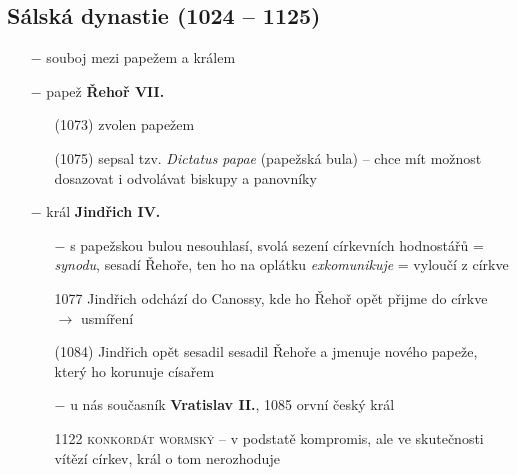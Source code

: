 \documentclass{article}
\begin{document}
\subsection*{Sálská dynastie (1024 -- 1125)}
\begin{itemize}
    \vspace{-0.5em}
    \setlength\itemsep{0.15em}
    \item[$-$] souboj mezi papežem a králem
    \item[$-$] papež \textbf{Řehoř VII.}
        \begin{itemize}
            \vspace{-0.5em}
            \setlength\itemsep{0.15em}
            \item[(1073)] zvolen papežem
            \item[(1075)] sepsal tzv. \textit{Dictatus papae} (papežská bula) -- chce mít možnost dosazovat i odvolávat biskupy a panovníky
        \end{itemize}
    \item[$-$] král \textbf{Jindřich IV.}
        \begin{itemize}
            \vspace{-0.5em}
            \setlength\itemsep{0.15em}
            \item[$-$] s papežskou bulou nesouhlasí, svolá sezení církevních hodnostářů = \textit{synodu}, sesadí Řehoře, ten ho na oplátku \textit{exkomunikuje} = vyloučí z církve
            \item[1077] Jindřich odchází do Canossy, kde ho Řehoř opět přijme do církve $\rightarrow$ usmíření
            \item[(1084)] Jindřich opět sesadil sesadil Řehoře a jmenuje nového papeže, který ho korunuje císařem
            \item[$-$] u nás současník \textbf{Vratislav II.}, 1085 orvní český král
            \item[1122] \textsc{konkordát wormský} -- v podstatě kompromis, ale ve skutečnosti vítězí církev, král o tom nerozhoduje
        \end{itemize}
\end{itemize}
\end{document}
